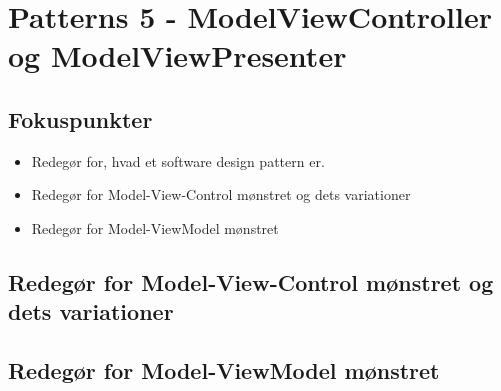 \section{Patterns 5 - ModelViewController og ModelViewPresenter}

\subsection{Fokuspunkter}

\begin{itemize}
	\item Redegør for, hvad et software design pattern er.
	\item Redegør for Model-View-Control mønstret og dets variationer
	\item Redegør for Model-ViewModel mønstret
\end{itemize}



\subsection{Redegør for Model-View-Control mønstret og dets variationer}
\derp

\subsection{Redegør for Model-ViewModel mønstret}
\derp
